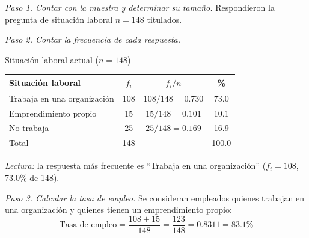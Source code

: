 \textit{Paso 1. Contar con la muestra y determinar su tamaño.} Respondieron la pregunta de situación laboral $n = 148$ titulados.

\textit{Paso 2. Contar la frecuencia de cada respuesta.}

\begin{mitabla}{Situación laboral actual ($n=148$)}
\begin{tabular}{lccc}
\toprule
Situación laboral & $f_i$ & $f_i / n$ & \% \\
\midrule
Trabaja en una organización & 108 & $108/148 = 0.730$ & 73.0 \\
Emprendimiento propio & 15 & $15/148 = 0.101$ & 10.1 \\
No trabaja & 25 & $25/148 = 0.169$ & 16.9 \\
\midrule
Total & 148 & & 100.0 \\
\bottomrule
\end{tabular}
\end{mitabla}

\textit{Lectura:} la respuesta más frecuente es ``Trabaja en una organización'' ($f_i = 108$, 73.0\% de 148).

\textit{Paso 3. Calcular la tasa de empleo.} Se consideran empleados quienes trabajan en una organización y quienes tienen un emprendimiento propio:
\[
\text{Tasa de empleo} = \frac{108 + 15}{148} = \frac{123}{148} = 0.8311 = 83.1\%
\]

